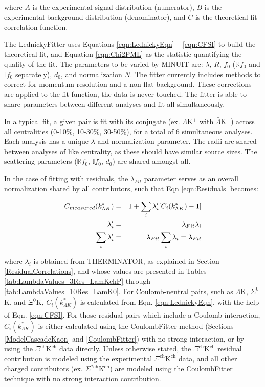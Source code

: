 \documentclass[ALICE,manyauthors]{cernphprep}
\begin{document}
where $A$ is the experimental signal distribution (numerator), $B$ is the experimental background distribution (denominator), and $C$ is the theoretical fit correlation function.

The LednickyFitter uses Equations \ref{eqn:LednickyEqn} -- \ref{eqn:CFSI} to build the theoretical fit, and Equation \ref{eqn:Chi2PML} as the statistic quantifying the quality of the fit.
The parameters to be varied by MINUIT are: $\lambda$, $R$, $f_{0}$ ($\mathbb{R}f_{0}$ and $\mathbb{I}f_{0}$ separately), $d_{0}$, and normalization $N$.
The fitter currently includes methods to correct for momentum resolution and a non-flat background.
These corrections are applied to the fit function, the data is never touched.
The fitter is able to share parameters between different analyses and fit all simultaneously.  

In a typical fit, a given pair is fit with its conjugate (ex. $\Lambda$K$^{+}$ with $\bar{\Lambda}$K$^{-}$) across all centralities (0-10\%, 10-30\%, 30-50\%), for a total of 6 simultaneous analyses.
Each analysis has a unique $\lambda$ and normalization parameter.
The radii are shared between analyses of like centrality, as these should have similar source sizes.
The scattering parameters ($\mathbb{R}f_{0}$, $\mathbb{I}f_{0}$, $d_{0}$) are shared amongst all.

In the case of fitting with residuals, the $\lambda_{Fit}$ parameter serves as an overall normalization shared by all contributors, such that Eqn \ref{eqn:Residuals} becomes:

\begin{eqnarray}
 C_{measured}(k^{*}_{\Lambda K}) &=& 1 + \sum\limits_{i}\lambda_{i}'[C_{i}(k^{*}_{\Lambda K})-1] \\
 \lambda_{i}' &=& \lambda_{Fit}\lambda_{i} \notag \\
 \sum\limits_{i}\lambda_{i}' &=&  \lambda_{Fit}\sum\limits_{i}\lambda_{i} = \lambda_{Fit} \notag
\label{eqn:ResidualsvLambdaNorm} 
\end{eqnarray}

where $\lambda_{i}$ is obtained from THERMINATOR, as explained in Section \ref{ResidualCorrelations}, and whose values are presented in Tables \ref{tab:LambdaValues_3Res_LamKchP} through \ref{tab:LambdaValues_10Res_LamK0}.  For Coulomb-neutral pairs, such as $\Lambda$K, $\Sigma^{0}$K, and $\Xi^{0}$K, $C_{i}(k^{*}_{\Lambda K})$ is calculated from Eqn. \ref{eqn:LednickyEqn}, with the help of Eqn. \ref{eqn:CFSI}.  For those residual pairs which include a Coulomb interaction, $C_{i}(k^{*}_{\Lambda K})$ is either calculated using the CoulombFitter method (Sections \ref{ModelCascadeKaon} and \ref{CoulombFitter}) with no strong interaction, or by using the $\Xi^{\mathrm{ch}}\mathrm{K^{ch}}$ data directly.  Unless otherwise stated, the $\Xi^{\mathrm{ch}}\mathrm{K^{ch}}$ residual contribution is modeled using the experimental $\Xi^{\mathrm{ch}}\mathrm{K^{ch}}$ data, and all other charged contributors (ex. $\Sigma^{*\mathrm{ch}}\mathrm{K^{ch}}$) are modeled using the CoulombFitter technique with no strong interaction contribution.
\end{document}
